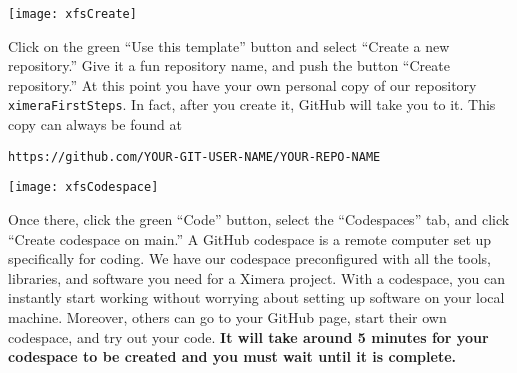 \documentclass{ximera}
\begin{document}
\begin{image}
    \texttt{[image: xfsCreate]}
\end{image}
        Click on the green ``Use this template'' button and select ``Create a
        new repository.'' Give it a fun repository name, and push the button
        ``Create repository.''
        At this point you have your own personal copy of our repository
        \verb!ximeraFirstSteps!.
        In fact, after you create it, GitHub will take you to it. This copy can
        always
        be found at
        \begin{center}
            \verb!https://github.com/YOUR-GIT-USER-NAME/YOUR-REPO-NAME!
        \end{center}
        \newpage
        \pdfOnly{\end{multicols}}
\begin{image}
    \texttt{[image: xfsCodespace]}
\end{image}
        Once there, click the green ``Code'' button, select
        the ``Codespaces'' tab, and click ``Create codespace on main.''
        A GitHub codespace is a remote computer set up specifically for coding.
        We have our codespace preconfigured with all the tools, libraries, and
        software
        you need for a Ximera
        project. With a codespace, you can instantly start working
        without worrying about setting up software on your local machine.
        Moreover,
        others can go to your GitHub page, start their own codespace, and try
        out your
        code.
        \textbf{It will take around 5 minutes for your codespace to be created
            and you
            must wait until it is complete.}
        \pdfOnly{\end{multicols}}

\newpage
\end{document}
